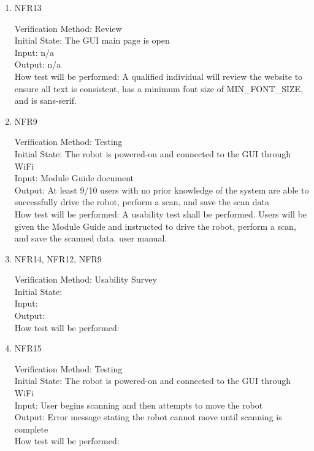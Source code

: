\documentclass[12pt, titlepage]{article}
\begin{document}
\begin{enumerate}
\item{NFR13\\}

Verification Method: Review\\					
Initial State: The GUI main page is open\\			
Input: n/a\\
Output: n/a\\
How test will be performed: A qualified individual will review the website to ensure all text is consistent, has a minimum font size of MIN\_FONT\_SIZE, and is sans-serif. \\

\item{NFR9\\}

Verification Method: Testing\\					
Initial State: The robot is powered-on and connected to the GUI through WiFi\\			
Input: Module Guide document\\
Output: At least 9/10 users with no prior knowledge of the system are able to successfully drive the robot, perform a scan, and save the scan data\\
How test will be performed: A usability test shall be performed. Users will be given the Module Guide and instructed to drive the robot, perform a scan, and save the scanned data.
user manual.\\ 

\item{NFR14, NFR12, NFR9\\}

Verification Method: Usability Survey\\					
Initial State: 		\\
Input: \\
Output: \\
How test will be performed:\\

\item{NFR15\\}

Verification Method: Testing\\					
Initial State: 	The robot is powered-on and connected to the GUI through WiFi	\\
Input: User begins scanning and then attempts to move the robot\\
Output: Error message stating the robot cannot move until scanning is complete\\
How test will be performed:


\end{enumerate}
\end{document}
